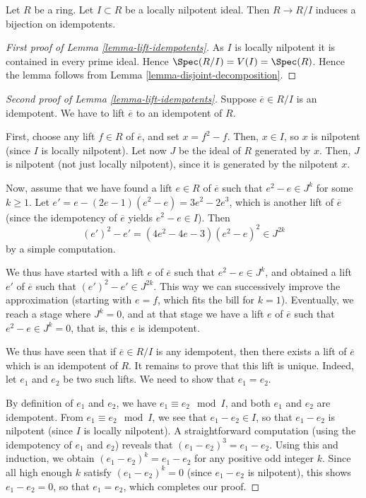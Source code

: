 \begin{lemma}
\label{lemma-lift-idempotents}
Let $R$ be a ring. Let $I \subset R$ be a locally nilpotent ideal.
Then $R \to R/I$ induces a bijection on idempotents.
\end{lemma}

\begin{proof}[First proof of Lemma \ref{lemma-lift-idempotents}]
As $I$ is locally nilpotent it is contained in every prime ideal.
Hence $\Spec(R/I) = V(I) = \Spec(R)$. Hence the
lemma follows from Lemma \ref{lemma-disjoint-decomposition}.
\end{proof}

\begin{proof}[Second proof of Lemma \ref{lemma-lift-idempotents}]
Suppose $\overline{e} \in R/I$ is an idempotent.
We have to lift $\overline{e}$ to an idempotent of $R$.

\medskip\noindent
First, choose any lift $f \in R$ of $\overline{e}$, and set
$x = f^2 - f$. Then, $x \in I$, so $x$ is nilpotent (since $I$
is locally nilpotent). Let now $J$ be the ideal of $R$ generated
by $x$. Then, $J$ is nilpotent (not just locally nilpotent),
since it is generated by the nilpotent $x$.

\medskip\noindent
Now, assume that we have found a lift $e \in R$ of $\overline{e}$
such that $e^2 - e \in J^k$ for some $k \geq 1$.
Let $e' = e - (2e - 1)(e^2 - e) = 3e^2 - 2e^3$, which is another
lift of $\overline{e}$ (since the idempotency of $\overline{e}$
yields $e^2 - e \in I$). Then
$$
(e')^2 - e' = (4e^2 - 4e - 3)(e^2 - e)^2 \in J^{2k}
$$
by a simple computation.

\medskip\noindent
We thus have started with a lift $e$ of $\overline{e}$ such
that $e^2 - e \in J^k$, and obtained a lift $e'$ of
$\overline{e}$ such that $(e')^2 - e' \in J^{2k}$.
This way we can successively improve the approximation
(starting with $e = f$, which fits the bill for $k = 1$).
Eventually, we reach a stage where $J^k = 0$, and at that
stage we have a lift $e$ of $\overline{e}$ such that
$e^2 - e \in J^k = 0$, that is, this $e$ is idempotent.

\medskip\noindent
We thus have seen that if $\overline{e} \in R/I$ is any
idempotent, then there exists a lift of $\overline{e}$
which is an idempotent of $R$.
It remains to prove that this lift is unique. Indeed, let
$e_1$ and $e_2$ be two such lifts. We
need to show that $e_1 = e_2$.

\medskip\noindent
By definition of $e_1$ and $e_2$, we have $e_1 \equiv e_2
\mod I$, and both $e_1$ and $e_2$ are idempotent. From
$e_1 \equiv e_2 \mod I$, we see that $e_1 - e_2 \in I$,
so that $e_1 - e_2$ is nilpotent (since $I$ is locally nilpotent).
A straightforward
computation (using the idempotency of $e_1$ and $e_2$)
reveals that $(e_1 - e_2)^3 = e_1 - e_2$. Using this and
induction, we obtain $(e_1 - e_2)^k = e_1 - e_2$ for any
positive odd integer $k$. Since all high enough $k$ satisfy
$(e_1 - e_2)^k = 0$ (since $e_1 - e_2$ is nilpotent),
this shows $e_1 - e_2 = 0$, so that $e_1 = e_2$, which
completes our proof.
\end{proof}